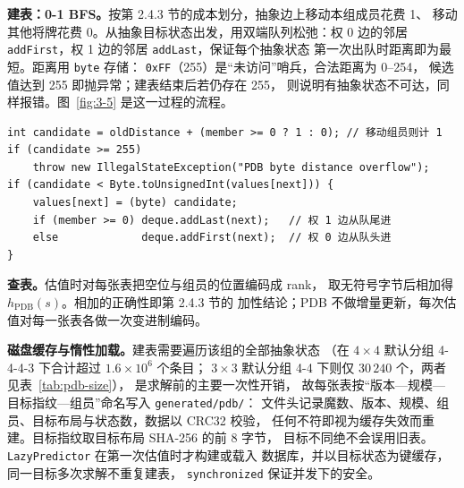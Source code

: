 
\textbf{建表：0-1 BFS。}按第 2.4.3 节的成本划分，抽象边上移动本组成员花费 1、
移动其他将牌花费 0。从抽象目标状态出发，用双端队列松弛：权 0 边的邻居
\texttt{addFirst}，权 1 边的邻居 \texttt{addLast}，保证每个抽象状态
第一次出队时距离即为最短。距离用 \texttt{byte} 存储：
\texttt{0xFF}（255）是“未访问”哨兵，合法距离为 0--254，
候选值达到 255 即抛异常；建表结束后若仍存在 255，
则说明有抽象状态不可达，同样报错。图~\ref{fig:3-5} 是这一过程的流程。

\par\noindent\begin{minipage}{\linewidth}
\par\vspace{2bp}
{\fontsize{9.5bp}{12bp}\selectfont
\noindent\begin{minipage}{\linewidth}
\begin{verbatim}
int candidate = oldDistance + (member >= 0 ? 1 : 0); // 移动组员则计 1
if (candidate >= 255)
    throw new IllegalStateException("PDB byte distance overflow");
if (candidate < Byte.toUnsignedInt(values[next])) {
    values[next] = (byte) candidate;
    if (member >= 0) deque.addLast(next);   // 权 1 边从队尾进
    else             deque.addFirst(next);  // 权 0 边从队头进
}
\end{verbatim}
\end{minipage}}
\end{minipage}\par


\textbf{查表。}估值时对每张表把空位与组员的位置编码成 rank，
取无符号字节后相加得 $h_{\mathrm{PDB}}(s)$。相加的正确性即第 2.4.3 节的
加性结论；PDB 不做增量更新，每次估值对每一张表各做一次变进制编码。

\textbf{磁盘缓存与惰性加载。}建表需要遍历该组的全部抽象状态
（在 $4\times4$ 默认分组 4-4-4-3 下合计超过 $1.6\times10^6$ 个条目；
$3\times3$ 默认分组 4-4 下则仅 $30\,240$ 个，两者见表~\ref{tab:pdb-size}），
是求解前的主要一次性开销，
故每张表按“版本—规模—目标指纹—组员”命名写入 \texttt{generated/pdb/}：
文件头记录魔数、版本、规模、组员、目标布局与状态数，数据以 CRC32 校验，
任何不符即视为缓存失效而重建。目标指纹取目标布局 SHA-256 的前 8 字节，
目标不同绝不会误用旧表。\texttt{LazyPredictor} 在第一次估值时才构建或载入
数据库，并以目标状态为键缓存，同一目标多次求解不重复建表，
\texttt{synchronized} 保证并发下的安全。

